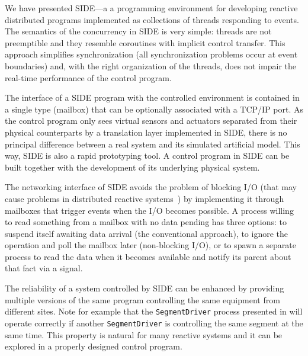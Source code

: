 We have presented SIDE---a
a programming environment
for developing reactive distributed programs implemented as
collections of threads responding to events.
The semantics of the concurrency in SIDE is very simple: threads are not
preemptible and they resemble coroutines with implicit control transfer.
This approach simplifies synchronization (all
synchronization problems occur at event boundaries)
and, with the right organization of the threads, does not impair the
real-time performance of the control program. 

The interface of a
SIDE program with the controlled
environment is contained in a single type (mailbox) that can be optionally
associated with a TCP/IP port.
As the control program only sees virtual sensors and actuators separated
from their physical counterparts by a translation layer implemented in SIDE,
there is no principal difference between a
real system and its simulated artificial model.
This way, SIDE is also a rapid prototyping tool. A control program in
SIDE can be built together
with the development of its underlying physical system. 

The networking interface of SIDE avoids the problem of blocking
I/O (that may cause problems in distributed reactive systems~\cite{scs95}) by
implementing it through mailboxes that trigger events
when the I/O becomes possible. A process willing to read
something from a mailbox with no data pending has three options:
to suspend itself awaiting data arrival (the
conventional approach),
to ignore the operation and poll the mailbox later (non-blocking I/O),
or to spawn a separate
process to read the data when it becomes available
and notify its parent about that fact via a signal.

The reliability of a system controlled by SIDE can be enhanced by providing
multiple versions of the same program controlling the same equipment from
different sites.
Note for example that the {\tt SegmentDriver} process presented in
 will operate correctly if another
{\tt SegmentDriver} is controlling the same segment at the same time.
This property is natural for many reactive systems and it can
be explored in a properly designed control program.


%



